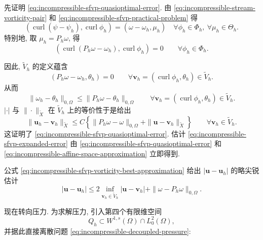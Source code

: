 \begin{Proof}
先证明 \eqref{eq:incompressible-sfvp-quasioptimal-error}.
由 \eqref{eq:incompressible-stream-vorticity-pair}
和 \eqref{eq:incompressible-sfvp-practical-problem} 得
\[
(\operatorname{curl}(\psi-\psi_h),\operatorname{curl}\phi_h)
=(\omega-\omega_h,\mu_h)
\quad\forall\phi_h\in\Phi_h,
\ \forall\mu_h\in\Theta_h.
\]
特别地, 取 $\mu_h=P_h\omega$, 得
\begin{equation}\label{eq:incompressible-sfvp-projected-orthogonality}
(\operatorname{curl}(P_h\omega-\omega_h),
\operatorname{curl}\phi_h)=0
\qquad\forall\phi_h\in\Phi_h.
\end{equation}

因此, $\widetilde V_h$ 的定义蕴含
\begin{equation}\label{eq:incompressible-sfvp-vorticity-orthogonality}
(P_h\omega-\omega_h,\theta_h)=0
\qquad
\forall\mathbf v_h=(\operatorname{curl}\phi_h,\theta_h)
\in\widetilde V_h.
\end{equation}
从而
\begin{equation}\label{eq:incompressible-sfvp-vorticity-best-approximation}
\|\omega_h-\theta_h\|_{0,\Omega}
\leq\|P_h\omega-\theta_h\|_{0,\Omega}
\qquad
\forall\mathbf v_h=(\operatorname{curl}\phi_h,\theta_h)
\in\widetilde V_h.
\end{equation}
$|\cdot|$ 与 $\|\cdot\|_{\widetilde X}$
在 $\widetilde V_h$ 上的等价性于是给出
\[
\|\mathbf u_h-\mathbf v_h\|_{\widetilde X}
\leq C\left\{
\|P_h\omega-\omega\|_{0,\Omega}
+\|\mathbf u-\mathbf v_h\|_{\widetilde X}
\right\}
\qquad\forall\mathbf v_h\in\widetilde V_h.
\]
这证明了 \eqref{eq:incompressible-sfvp-quasioptimal-error}.
估计 \eqref{eq:incompressible-sfvp-expanded-error}
由 \eqref{eq:incompressible-sfvp-quasioptimal-error}
和 \eqref{eq:incompressible-affine-space-approximation} 立即得到.
\end{Proof}

\begin{Remark}\label{rem:incompressible-sfvp-sharper-seminorm-error}
公式 \eqref{eq:incompressible-sfvp-vorticity-best-approximation}
给出 $|\mathbf u-\mathbf u_h|$ 的略尖锐估计
\[
|\mathbf u-\mathbf u_h|
\leq2\inf_{\mathbf v_h\in\widetilde V_h}
|\mathbf u-\mathbf v_h|
+\|\omega-P_h\omega\|_{0,\Omega}.
\]
\end{Remark}

现在转向压力. 为求解压力, 引入第四个有限维空间
\begin{equation}\label{eq:incompressible-sfvp-pressure-space}
Q_h\subset W^{1,s}(\Omega)\cap L_0^2(\Omega),
\end{equation}
并据此直接离散问题 \eqref{eq:incompressible-decoupled-pressure}:

